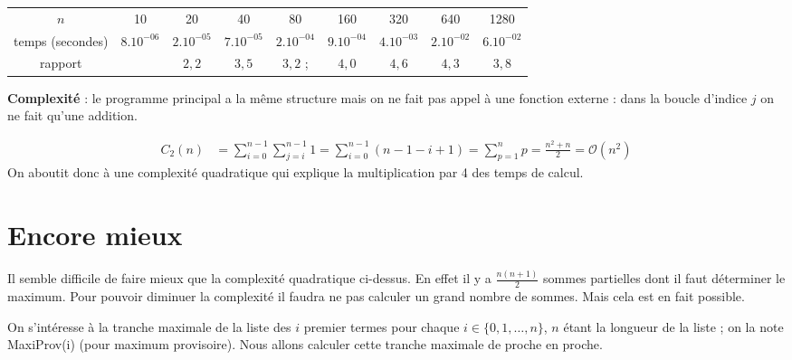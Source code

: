 \begin{center}
\begin{tabular}{c|cccccccc}
$n$              & 10           &  20          & 40           & 80           & 160          & 320          & 640          & 1280 \\
temps (secondes) & $8.10^{-06}$ & $2.10^{-05}$ & $7.10^{-05}$ & $2.10^{-04}$ & $9.10^{-04}$ & $4.10^{-03}$ & $2.10^{-02}$ & $6.10^{-02}$\\
rapport          &              & $2,2$        & $3,5$        & $3,2$    ;   & $4,0$        & $4,6$        & $4,3$        & $3,8$       \\
\end{tabular}
\end{center}

\medskip

{\bf Complexité} : le programme principal a la même structure mais on ne fait pas appel à une fonction externe : dans la boucle d'indice $j$ on ne fait qu'une addition.

\begin{align*}
 C_2(n) 
 &
= \sum_{i=0}^{n-1} \sum_{j=i}^{n-1} 1
= \sum_{i=0}^{n-1} (n-1-i+1) %
= \sum_{p=1}^{n} p
=\frac{n^2+n}{2}={\mathcal O}(n^2)
\end{align*}
On aboutit donc à une complexité quadratique qui explique la multiplication par 4 des temps de calcul.
\newpage
\section{Encore mieux}
Il semble difficile de faire mieux que la complexité quadratique ci-dessus. En effet il y a $\frac{n(n+1)}2$ sommes partielles dont il faut déterminer le maximum. Pour pouvoir diminuer la complexité il faudra ne pas calculer un grand nombre de sommes. Mais cela est en fait possible.

\medskip

On s'intéresse à la tranche maximale de la liste des $i$ premier termes pour chaque $i\in\{0,1,\ldots, n\}$, $n$ étant la longueur de la liste ; on la note MaxiProv(i) (pour maximum provisoire). Nous allons calculer cette tranche maximale de proche en proche.

